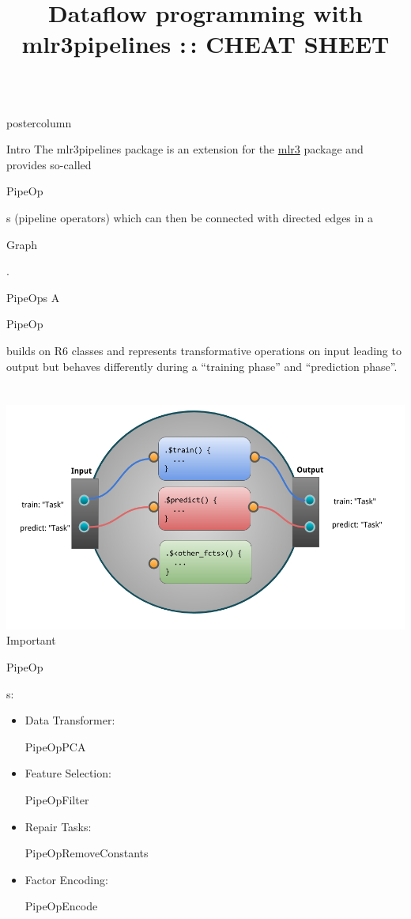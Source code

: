 \documentclass{beamer}
\title{Dataflow programming with mlr3pipelines :\,: CHEAT SHEET} %
\newlength{\columnheight} %
\newcommand{\codeinline}[1]{\begin{codeboxinline}#1\end{codeboxinline}}
\begin{document}
\begin{frame}[fragile]{}
	\begin{columns}
		\begin{column}{.245\textwidth}
			\begin{beamercolorbox}[center]{postercolumn}
				\begin{minipage}{.98\textwidth}
					\parbox[t][\columnheight]{\textwidth}{
						\begin{myblock}{Intro}
              The mlr3pipelines package is an extension for the \href{https://github.com/mlr-org/mlr3}{mlr3} package and provides so-called \codeinline{PipeOp}s (pipeline operators) which can then be connected with directed edges in a \codeinline{Graph}.
            \end{myblock}
						\begin{myblock}{PipeOps}
              A \codeinline{PipeOp} builds on R6 classes and represents transformative operations on input leading to output but behaves differently during a ``training phase'' and ``prediction phase''. %
              \ \\
              \ \\
              \includegraphics[width=\textwidth]{img/po_viz.png}
              Important \codeinline{PipeOp}s:
              \begin{itemize}
                \item Data Transformer: \codeinline{PipeOpPCA}
                \item Feature Selection: \codeinline{PipeOpFilter}
                \item Repair Tasks: \codeinline{PipeOpRemoveConstants}
                \item Factor Encoding: \codeinline{PipeOpEncode}

\end{itemize}
\end{myblock}}
\end{minipage}
\end{beamercolorbox}
\end{column}
\end{columns}
\end{frame}
\end{document}

